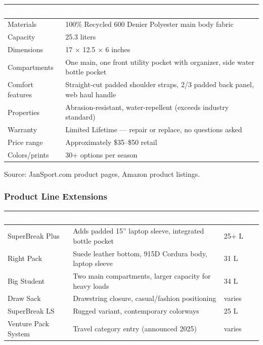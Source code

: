 \documentclass[11pt,letterpaper]{article}
\newcommand{\tableheader}[1]{\textbf{\sffamily\textcolor{white}{#1}}}
\begin{document}
\begin{center}
\begin{tabularx}{\textwidth}{L{4cm}X}
\toprule
{}
\tableheader{Specification} & \tableheader{Detail} \\
\midrule
Materials & 100\% Recycled 600 Denier Polyester main body fabric \\
Capacity & 25.3 liters \\
Dimensions & 17 $\times$ 12.5 $\times$ 6 inches \\
Compartments & One main, one front utility pocket with organizer, side water bottle pocket \\
Comfort features & Straight-cut padded shoulder straps, 2/3 padded back panel, web haul handle \\
Properties & Abrasion-resistant, water-repellent (exceeds industry standard) \\
Warranty & Limited Lifetime --- repair or replace, no questions asked \\
Price range & Approximately \$35--\$50 retail \\
Colors/prints & 30+ options per season \\
\bottomrule
\end{tabularx}
\end{center}

Source: JanSport.com product pages, Amazon product listings.

\subsubsection{Product Line Extensions}

\begin{center}
\begin{tabularx}{\textwidth}{L{3.5cm}XC{2cm}}
\toprule
{}
\tableheader{Product} & \tableheader{Differentiation} & \tableheader{Capacity} \\
\midrule
SuperBreak Plus & Adds padded 15'' laptop sleeve, integrated bottle pocket & 25+ L \\
Right Pack & Suede leather bottom, 915D Cordura body, laptop sleeve & 31 L \\
Big Student & Two main compartments, larger capacity for heavy loads & 34 L \\
Draw Sack & Drawstring closure, casual/fashion positioning & varies \\
SuperBreak LS & Rugged variant, contemporary colorways & 25 L \\
Venture Pack System & Travel category entry (announced 2025) & varies \\
\bottomrule
\end{tabularx}
\end{center}
\end{document}

